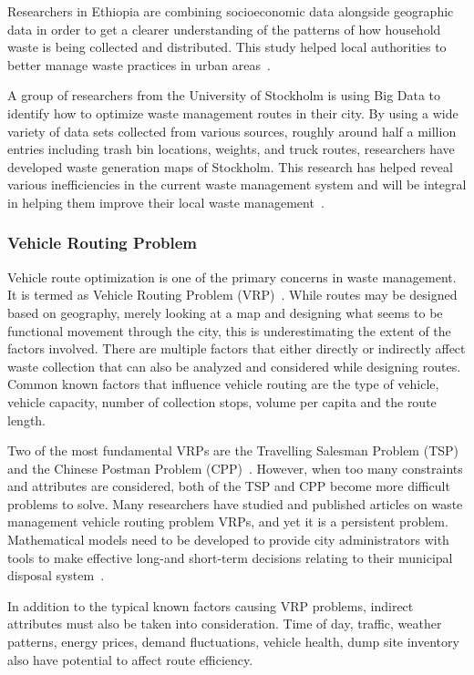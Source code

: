 Researchers in Ethiopia are combining socioeconomic data alongside geographic 
data in order to get a clearer understanding of the patterns of how household 
waste is being collected and distributed. This study helped local authorities 
to better manage waste practices in urban areas~\cite{markvan2016}. 

A group of researchers from the University of Stockholm is using Big Data to 
identify how to optimize waste management routes in their city. By using a 
wide variety of data sets collected from various sources, roughly around half 
a million entries including trash bin locations, weights, and truck routes, 
researchers have developed waste generation maps of Stockholm. This research 
has helped reveal various inefficiencies in the current waste management 
system and will be integral in helping them improve their local waste 
management~\cite{markvan2016}.

\subsubsection{Vehicle Routing Problem}
Vehicle route optimization is one of the primary concerns in waste management. 
It is termed as Vehicle Routing Problem (VRP)~\cite{dantzig1959}.  
While routes may be designed based on geography, merely looking at a map and 
designing what seems to be functional movement through the city, this is 
underestimating the extent of the factors involved.  There are multiple 
factors that either directly or indirectly affect waste collection that can 
also be analyzed and considered while designing routes. Common known factors 
that influence vehicle routing are the type of vehicle, vehicle capacity, 
number of collection stops, volume per capita and the route length. 

Two of the most fundamental VRPs are the Travelling Salesman Problem (TSP) 
and the Chinese Postman Problem (CPP)~\cite{belien2012}. However, when too 
many constraints and attributes are considered, both of the TSP and CPP become 
more difficult problems to solve. Many researchers have studied and published 
articles on waste management vehicle routing problem VRPs, and yet it is a 
persistent problem. Mathematical models need to be developed to provide city 
administrators with tools to make effective long-and short-term decisions 
relating to their municipal disposal system~\cite{bhat1996}. 

In addition to the typical known factors causing VRP problems, indirect 
attributes must also be taken into consideration.  Time of day, traffic, 
weather patterns, energy prices, demand fluctuations, vehicle health, 
dump site inventory also have potential to affect route efficiency. 


